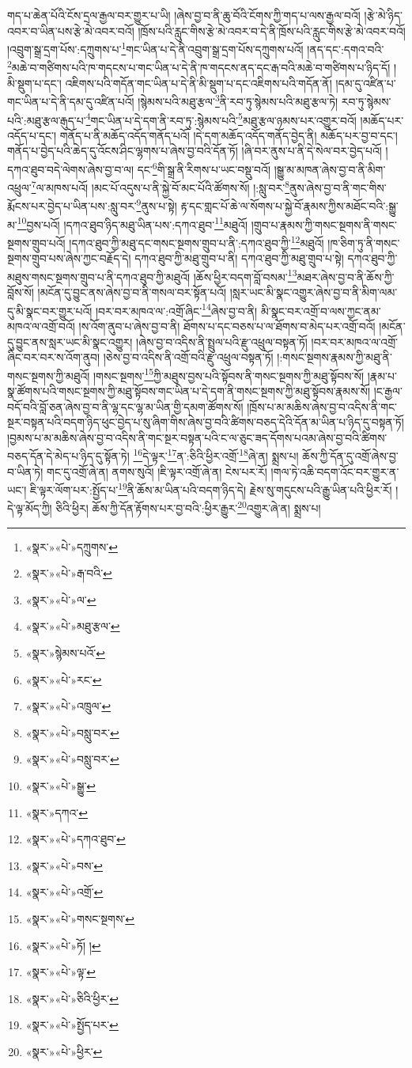 གད་པ་ཆེན་པོའི་ངོས་དྲལ་རྒྱལ་བར་གྱུར་པ་ཡི། །ཞེས་བྱ་བ་ནི་ཆུ་བོའི་ངོགས་ཀྱི་གད་པ་ལས་རྒྱལ་བའོ། །རྩེ་མེ་ཉིད་འབར་བ་ཡིན་པས་རྩེ་མེ་འབར་བའོ། །ཁྲོས་པའི་རླུང་གིས་རྩེ་མེ་འབར་བ་དེ་ནི་ཁྲོས་པའི་རླུང་གིས་རྩེ་མེ་འབར་བའོ། །འབྲུག་སྒྲ་དྲག་པོས་:དཀྲུགས་པ་\footnote{«སྣར་»«པེ་»དཀྲུགས་}གང་ཡིན་པ་དེ་ནི་འབྲུག་སྒྲ་དྲག་པོས་དཀྲུགས་པའོ། །ནད་དང་:དགའ་བའི་\footnote{«སྣར་»«པེ་»རྒ་བའི་}མཆེ་བ་གཙིགས་པའི་ཁ་གདངས་པ་གང་ཡིན་པ་དེ་ནི་ཁ་གདངས་ནད་དང་རྒ་བའི་མཆེ་བ་གཙིགས་པ་ཉིད་དོ། །མི་སྡུག་པ་དང་། འཇིགས་པའི་གདོན་གང་ཡིན་པ་དེ་ནི་མི་སྡུག་པ་དང་འཇིགས་པའི་གདོན་ནོ། །དམ་དུ་འཛིན་པ་གང་ཡིན་པ་དེ་ནི་དམ་དུ་འཛིན་པའོ། །སྙེམས་པའི་མཐུ་རྩལ་\footnote{«སྣར་»«པེ་»ལ་}ནི་རབ་ཏུ་སྙེམས་པའི་མཐུ་རྩལ་ཏེ། རབ་ཏུ་སྙེམས་པའི་:མཐུ་རྩལ་རྒུད་པ་\footnote{«སྣར་»«པེ་»མཐུ་རྩལ་}གང་ཡིན་པ་དེ་དག་ནི་རབ་ཏུ་:སྙེམས་པའི་\footnote{«སྣར་»སྙེམས་པའོ་}མཐུ་རྩལ་ཉམས་པར་འགྱུར་བའོ། །མཆོད་པར་འདོད་པ་དང་། གནོད་པ་ནི་མཆོད་འདོད་གནོད་པའོ། །དེ་དག་མཆོད་འདོད་གནོད་བྱེད་ནི། མཆོད་པར་བྱ་བ་དང་། གནོད་པ་བྱེད་པའི་ཆེད་དུ་འོངས་ཤིང་ལྷགས་པ་ཞེས་བྱ་བའི་དོན་ཏོ། །ཞི་བར་ནུས་པ་ནི་དེ་སེལ་བར་བྱེད་པའོ། །དཀའ་ཐུབ་བདེ་ལེགས་ཞེས་བྱ་བ་ལ། དང་\footnote{«སྣར་»«པེ་»རང་}གི་སྒྲ་ནི་རིགས་པ་ཡང་བསྡུ་བའོ། །སྒྱུ་མ་མཁན་ཞེས་བྱ་བ་ནི་མིག་འཕྲུལ་\footnote{«སྣར་»«པེ་»འཁྲུལ་}ལ་མཁས་པའོ། །མང་པོ་འདུས་པ་ནི་སྐྱེ་བོ་མང་པོའི་ཚོགས་སོ། །:སླུ་བར་\footnote{«སྣར་»«པེ་»བསླུ་བར་}ནུས་ཞེས་བྱ་བ་ནི་གང་གིས་རྨོངས་པར་བྱེད་པ་ཡིན་པས་:སླུ་བར་\footnote{«སྣར་»«པེ་»བསླུ་བར་}ནུས་པ་སྟེ། རྟ་དང་གླང་པོ་ཆེ་ལ་སོགས་པ་སྐྱེ་བོ་རྣམས་ཀྱིས་མཐོང་བའི་:སྒྱུ་མ་\footnote{«སྣར་»«པེ་»སྒྱུ་}བྱས་པའོ། །དཀའ་ཐུབ་ཉིད་མཐུ་ཡིན་པས་:དཀའ་ཐུབ་\footnote{«སྣར་»དཀའ་}མཐུའོ། །གྲུབ་པ་རྣམས་ཀྱི་གསང་སྔགས་ནི་གསང་སྔགས་གྲུབ་པའོ། །དཀའ་ཐུབ་ཀྱི་མཐུ་དང་གསང་སྔགས་གྲུབ་པ་ནི་:དཀའ་ཐུབ་ཀྱི་\footnote{«སྣར་»«པེ་»དཀའ་ཐུབ་}མཐུའོ། །ཁ་ཅིག་ཏུ་ནི་གསང་སྔགས་གྲུབ་པས་ཞེས་ཀྱང་བརྗོད་དེ། དཀའ་ཐུབ་ཀྱི་མཐུ་གྲུབ་པ་ནི། དཀའ་ཐུབ་ཀྱི་མཐུ་གྲུབ་པ་སྟེ། དཀའ་ཐུབ་ཀྱི་མཐུས་གསང་སྔགས་གྲུབ་པ་ནི་དཀའ་ཐུབ་ཀྱི་མཐུའོ། །ཆོས་ཕྱིར་བདག་བློ་བསམ་\footnote{«སྣར་»«པེ་»བས་}མཐར་ཞེས་བྱ་བ་ནི་ཆོས་ཀྱི་བློས་སོ། །མངོན་དུ་བྱུང་ནས་ཞེས་བྱ་བ་ནི་གསལ་བར་སྟོན་པའོ། །སླར་ཡང་མི་སྣང་འགྱུར་ཞེས་བྱ་བ་ནི་མིག་ལམ་དུ་མི་སྣང་བར་གྱུར་པའོ། །བར་བར་མཁའ་ལ་:འགྲོ་ཞིང་\footnote{«སྣར་»«པེ་»འགྲོ་}ཞེས་བྱ་བ་ནི། མི་སྣང་བར་འགྲོ་བ་ལས་ཀྱང་ནམ་མཁའ་ལ་འགྲོ་བའོ། །ས་འོག་ནུབ་པ་ཞེས་བྱ་བ་ནི། ཐོགས་པ་དང་བཅས་པ་ལ་ཐོགས་བ་མེད་པར་འགྲོ་བའོ། །མངོན་དུ་བྱུང་ནས་སླར་ཡང་མི་སྣང་འགྱུར། །ཞེས་བྱ་བ་འདིས་ནི་སྤྲུལ་པའི་རྫུ་འཕྲུལ་བསྟན་ཏོ། །བར་བར་མཁའ་ལ་འགྲོ་ཞིང་བར་བར་ས་འོག་ནུབ། །ཅེས་བྱ་བ་འདིས་ནི་འགྲོ་བའི་རྫུ་འཕྲུལ་བསྟན་ཏོ། །:གསང་སྔགས་རྣམས་ཀྱི་མཐུ་ནི་གསང་སྔགས་ཀྱི་མཐུའོ། །གསང་སྔགས་\footnote{«སྣར་»«པེ་»གསང་སྔགས་}ཀྱི་མཐུས་བྱས་པའི་སྟོབས་ནི་གསང་སྔགས་ཀྱི་མཐུ་སྟོབས་སོ། །རྣམ་པ་སྣ་ཚོགས་པའི་གསང་སྔགས་ཀྱི་མཐུ་སྟོབས་གང་ཡིན་པ་དེ་དག་ནི་གསང་སྔགས་ཀྱི་མཐུ་སྟོབས་རྣམས་སོ། །ང་རྒྱལ་བདོ་བའི་བློ་ཅན་ཞེས་བྱ་བ་ནི་ལྷ་དང་ལྷ་མ་ཡིན་གྱི་དམག་ཚོགས་སོ། །ཁྲོས་པ་མ་མཆིས་ཞེས་བྱ་བ་འདིས་ནི་གང་སྔར་བསྟན་པའི་བདག་ཉིད་ཕུང་བྱེད་པ་སུ་ཞིག་གིས་ཞེས་བྱ་བའི་ཚིགས་བཅད་དེའི་དོན་མ་ཡིན་པ་ཉིད་དུ་བསྟན་ཏོ། །བྱམས་པ་མ་མཆིས་ཞེས་བྱ་བ་འདིས་ནི་གང་སྔར་བསྟན་པའི་ང་ལ་ཅུང་ཟད་དོགས་པའམ་ཞེས་བྱ་བའི་ཚིགས་བཅད་དོན་དེ་མེད་པ་ཉིད་དུ་སྟོན་ཏེ། \footnote{«སྣར་»«པེ་»ཏོ། །}དེ་ལྟར་\footnote{«སྣར་»«པེ་»ལྟ་}ན་:ཅིའི་ཕྱིར་འགྲོ་\footnote{«སྣར་»«པེ་»ཅིའི་ཕྱིར་}ཞེ་ན། སྨྲས་པ། ཆོས་ཀྱི་དོན་དུ་འགྲོ་ཞེས་བྱ་བ་ཡིན་ཏེ། གང་དུ་འགྲོ་ཞེ་ན། ནགས་སུའོ། །ཇི་ལྟར་འགྲོ་ཞེ་ན། ངེས་པར་རོ། །གལ་ཏེ་འཆི་བདག་འོང་བར་གྱུར་ན་ཡང་། ཇི་ལྟར་ལོག་པར་:སྤྱོད་པ་\footnote{«སྣར་»«པེ་»སྤྱོད་པར་}ནི་ཆོས་མ་ཡིན་པའི་བདག་ཉིད་དེ། རྗེས་སུ་གདུངས་པའི་རྒྱུ་ཡིན་པའི་ཕྱིར་རོ། །དེ་ལྟ་མོད་ཀྱི། ཅིའི་ཕྱིར། ཆོས་ཀྱི་དོན་རྟོགས་པར་བྱ་བའི་:ཕྱིར་རྒྱུར་\footnote{«སྣར་»«པེ་»ཕྱིར་}འགྱུར་ཞེ་ན། སྨྲས་པ། 